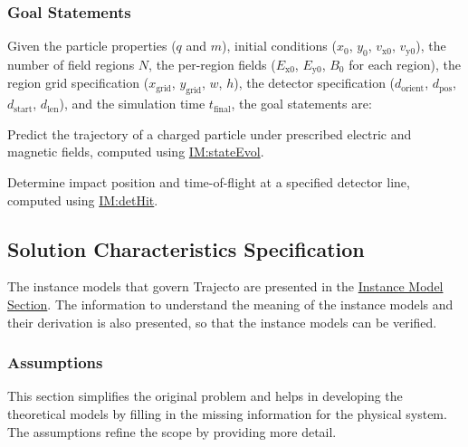 \documentclass[12pt]{article}
\begin{document}
\subsubsection{Goal Statements}
\label{Sec:GoalStmt}
Given the particle properties ($q$ and $m$), initial conditions (${x_{0}}$, ${y_{0}}$, ${v_{\text{x}0}}$, ${v_{\text{y}0}}$), the number of field regions $N$, the per-region fields (${E_{\text{x}0}}$, ${E_{\text{y}0}}$, ${B_{0}}$ for each region), the region grid specification (${x_{\text{grid}}}$, ${y_{\text{grid}}}$, $w$, $h$), the detector specification (${d_{\text{orient}}}$, ${d_{\text{pos}}}$, ${d_{\text{start}}}$, ${d_{\text{len}}}$), and the simulation time ${t_{\text{final}}}$, the goal statements are:

\begin{description}[font=\normalfont]
\item[predictTrajectory:\phantomsection\label{predictTrajectory}]{Predict the trajectory of a charged particle under prescribed electric and magnetic fields, computed using \hyperref[IM:stateEvol]{IM:stateEvol}.}
\item[determineDetectorOutcome:\phantomsection\label{determineDetectorOutcome}]{Determine impact position and time-of-flight at a specified detector line, computed using \hyperref[IM:detHit]{IM:detHit}.}
\end{description}
\subsection{Solution Characteristics Specification}
\label{Sec:SolCharSpec}
The instance models that govern Trajecto are presented in the \hyperref[Sec:IMs]{Instance Model Section}. The information to understand the meaning of the instance models and their derivation is also presented, so that the instance models can be verified.

\subsubsection{Assumptions}
\label{Sec:Assumps}
This section simplifies the original problem and helps in developing the theoretical models by filling in the missing information for the physical system. The assumptions refine the scope by providing more detail.
\end{document}
